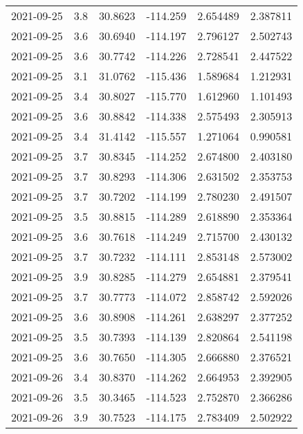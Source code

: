 \begin{tabular}{lrrrrr}
2021-09-25 &       3.8 &  30.8623 &  -114.259 &         2.654489 &         2.387811 \\
2021-09-25 &       3.6 &  30.6940 &  -114.197 &         2.796127 &         2.502743 \\
2021-09-25 &       3.6 &  30.7742 &  -114.226 &         2.728541 &         2.447522 \\
2021-09-25 &       3.1 &  31.0762 &  -115.436 &         1.589684 &         1.212931 \\
2021-09-25 &       3.4 &  30.8027 &  -115.770 &         1.612960 &         1.101493 \\
2021-09-25 &       3.6 &  30.8842 &  -114.338 &         2.575493 &         2.305913 \\
2021-09-25 &       3.4 &  31.4142 &  -115.557 &         1.271064 &         0.990581 \\
2021-09-25 &       3.7 &  30.8345 &  -114.252 &         2.674800 &         2.403180 \\
2021-09-25 &       3.7 &  30.8293 &  -114.306 &         2.631502 &         2.353753 \\
2021-09-25 &       3.7 &  30.7202 &  -114.199 &         2.780230 &         2.491507 \\
2021-09-25 &       3.5 &  30.8815 &  -114.289 &         2.618890 &         2.353364 \\
2021-09-25 &       3.6 &  30.7618 &  -114.249 &         2.715700 &         2.430132 \\
2021-09-25 &       3.7 &  30.7232 &  -114.111 &         2.853148 &         2.573002 \\
2021-09-25 &       3.9 &  30.8285 &  -114.279 &         2.654881 &         2.379541 \\
2021-09-25 &       3.7 &  30.7773 &  -114.072 &         2.858742 &         2.592026 \\
2021-09-25 &       3.6 &  30.8908 &  -114.261 &         2.638297 &         2.377252 \\
2021-09-25 &       3.5 &  30.7393 &  -114.139 &         2.820864 &         2.541198 \\
2021-09-25 &       3.6 &  30.7650 &  -114.305 &         2.666880 &         2.376521 \\
2021-09-26 &       3.4 &  30.8370 &  -114.262 &         2.664953 &         2.392905 \\
2021-09-26 &       3.5 &  30.3465 &  -114.523 &         2.752870 &         2.366286 \\
2021-09-26 &       3.9 &  30.7523 &  -114.175 &         2.783409 &         2.502922 \\

\end{tabular}

